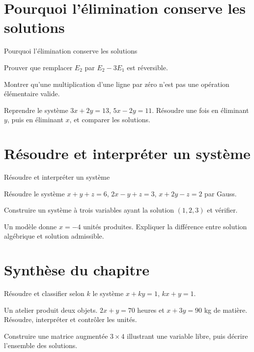 \section{Pourquoi l'élimination conserve les solutions}
\label{workbook:section:12.08}
\begin{exerciseblock}{Pourquoi l'élimination conserve les solutions}
\item Prouver que remplacer $E_2$ par $E_2-3E_1$ est réversible.
\item Montrer qu'une multiplication d'une ligne par zéro n'est pas une opération élémentaire valide.
\item Reprendre le système $3x+2y=13$, $5x-2y=11$. Résoudre une fois en éliminant $y$, puis en éliminant $x$, et comparer les solutions.
\end{exerciseblock}
\section{Résoudre et interpréter un système}
\label{workbook:section:12.09}
\begin{exerciseblock}{Résoudre et interpréter un système}
\item Résoudre le système $x+y+z=6$, $2x-y+z=3$, $x+2y-z=2$ par Gauss.
\item Construire un système à trois variables ayant la solution $(1,2,3)$ et vérifier.
\item Un modèle donne $x=-4$ unités produites. Expliquer la différence entre solution algébrique et solution admissible.
\end{exerciseblock}
\section*{Synthèse du chapitre}
\begin{synthesisbox}
\item Résoudre et classifier selon $k$ le système $x+ky=1$, $kx+y=1$.
\item Un atelier produit deux objets. $2x+y=70$ heures et $x+3y=90$ kg de matière. Résoudre, interpréter et contrôler les unités.
\item Construire une matrice augmentée $3\times4$ illustrant une variable libre, puis décrire l'ensemble des solutions.
\end{synthesisbox}

